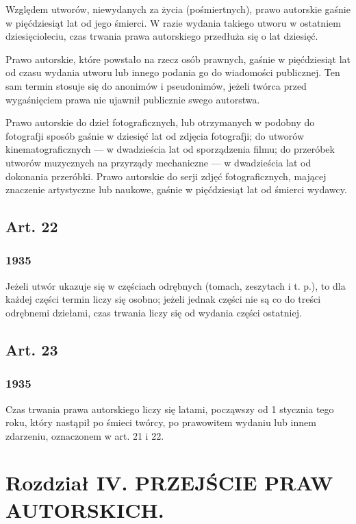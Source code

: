 \documentclass[withmarginpar]{book}
\begin{document}
Względem utworów, niewydanych za życia (pośmiertnych), prawo autorskie
gaśnie w pięćdziesiąt lat od jego śmierci. W razie wydania takiego
utworu w ostatniem dziesięcioleciu, czas trwania prawa autorskiego
przedłuża się o lat dziesięć.

Prawo autorskie, które powstało na rzecz osób prawnych, gaśnie w
pięćdziesiąt lat od czasu wydania utworu lub innego podania go do
wiadomości publicznej. Ten sam termin stosuje się do anonimów i
pseudonimów, jeżeli twórca przed wygaśnięciem prawa nie ujawnił
publicznie swego autorstwa.

Prawo autorskie do dzieł fotograficznych, lub otrzymanych w podobny do
fotografji sposób gaśnie w dziesięć lat od zdjęcia fotografji; do
utworów kinematograficznych — w dwadzieścia lat od sporządzenia filmu;
do przeróbek utworów muzycznych na przyrządy mechaniczne — w
dwadzieścia lat od dokonania przeróbki. Prawo autorskie do serji zdjęć
fotograficznych, mającej znaczenie artystyczne lub naukowe, gaśnie w
pięćdziesiąt lat od śmierci wydawcy.

\section{Art. 22}
\label{sec:art.-22}
\subsection{1935}
\label{sec:art.-22-1}

Jeżeli utwór ukazuje się w częściach odrębnych (tomach, zeszytach i
t. p.), to dla każdej części termin liczy się osobno; jeżeli jednak
części nie są co do treści odrębnemi dziełami, czas trwania liczy się
od wydania części ostatniej.

\section{Art. 23}
\label{sec:art.-23}
\subsection{1935}
\label{sec:art.-23-1}

Czas trwania prawa autorskiego liczy się latami, począwszy od 1
stycznia tego roku, który nastąpił po śmieci twórcy, po prawowitem
wydaniu lub innem zdarzeniu, oznaczonem w art. 21 i 22.

\chapter{Rozdział   IV.
PRZEJŚCIE PRAW AUTORSKICH.}
\label{cha:r-o-z-2}
\end{document}
